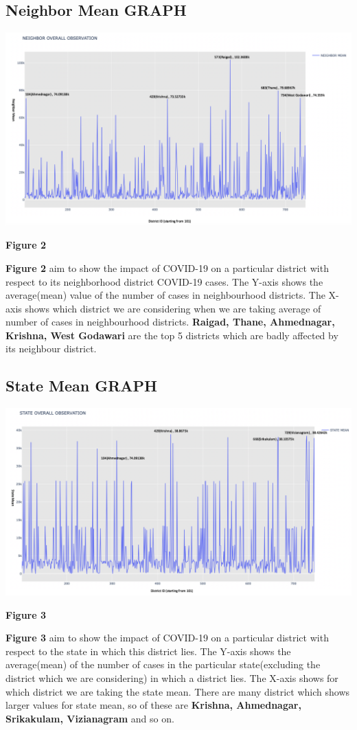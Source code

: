 \documentclass{report}
\begin{document}
\subsection{Neighbor Mean GRAPH}
\includegraphics[scale=0.335]{images/Neighbor Mean.png}
\centerline{\textbf{Figure 2}} \newline\newline
\justify \textbf{Figure 2} aim to show the impact of COVID-19 on a particular district with respect to its neighborhood district COVID-19 cases. The Y-axis shows the average(mean) value of the number of cases in neighbourhood districts. The X-axis shows which district we are considering when we are taking average of number of cases in neighbourhood districts. 
\newline \textbf{Raigad, Thane, Ahmednagar, Krishna, West Godawari} are the top 5 districts which are badly affected by its neighbour district.

\newpage    
\subsection{State Mean GRAPH}
\includegraphics[scale=0.32]{images/State Mean.png}
\centerline{\textbf{Figure 3}} \newline\newline
\justify \textbf{Figure 3} aim to show the impact of COVID-19 on a particular district with respect to the state in which this district lies. The Y-axis shows the average(mean) of the number of cases in the particular state(excluding the district which we are considering) in which a district lies. The X-axis shows for which district we are taking the state mean.
\newline There are many district which shows larger values for state mean, so of these are \textbf{Krishna, Ahmednagar, Srikakulam, Vizianagram} and so on.
\end{document}
